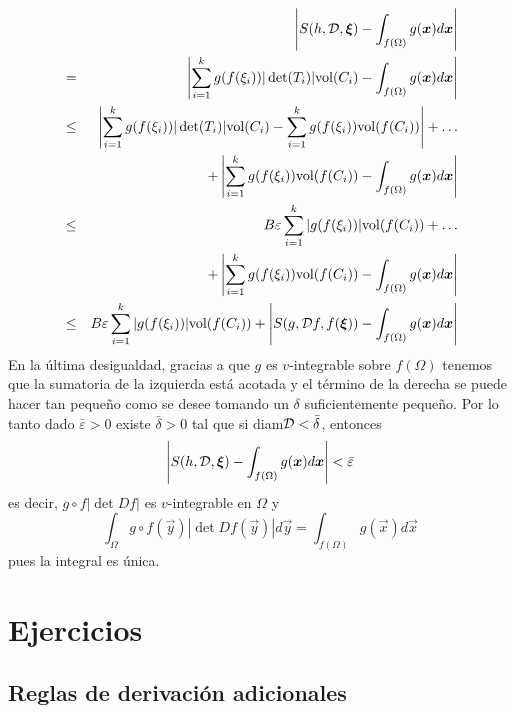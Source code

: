 \begin{demostracion}
\begin{eqnarray*}
& &\left|S(h,{\cal D},\vec{\xi})-\int_{f(\Omega)}g(\vec{x})d\vec{x}\right|\\
&=&\left|\sum_{i=1}^kg(f(\xi_i))|\det(T_i)|{\rm
vol}(C_i)-\int_{f(\Omega)}g(\vec{x})d\vec{x}\right| \\ 
&\leq& \left|\sum_{i=1}^kg(f(\xi_i))|\det(T_i)|{\rm
vol}(C_i)-\sum_{i=1}^kg(f(\xi_i)){\rm vol}(f(C_i))\right|+\ldots \\ 
& & + \left|\sum_{i=1}^kg(f(\xi_i)){\rm
vol}(f(C_i))-\int_{f(\Omega)}g(\vec{x})d\vec{x}\right| \\ 
&\leq& B\varepsilon\sum_{i=1}^k|g(f(\xi_i))|{\rm vol}(f(C_i))+\ldots \\ 
& & + \left|\sum_{i=1}^kg(f(\xi_i)){\rm
vol}(f(C_i))-\int_{f(\Omega)}g(\vec{x})d\vec{x}\right| \\ 
&\leq&
B\varepsilon\sum_{i=1}^k|g(f(\xi_i))|{\rm
vol}(f(C_i))+\left|S(g,{\cal D}f,f(\vec{\xi}))-\int_{f(\Omega)}g(\vec{x})d\vec{x}\right|
\end{eqnarray*}
En la \'ultima desigualdad, gracias a que $g$ es $v$-integrable
sobre $f(\Omega)$ tenemos que la sumatoria de la izquierda est\'a
acotada y el t\'ermino de la derecha se puede hacer tan peque\~no
como se desee tomando un $\delta$ suficientemente peque\~no. Por
lo tanto dado $\bar{\varepsilon}>0$ existe $\bar{\delta}>0$ tal que si
diam${\cal D}<\bar{\delta}$, entonces
\[\left|S(h,{\cal D},\vec{\xi})-\int_{f(\Omega)}g(\vec{x})d\vec{x}\right|<\bar{\varepsilon}\]
es decir, $g\circ f|\det Df|$ es $v$-integrable en $\Omega$ y
\[\int_{\Omega}g\circ f(\vec{y})|\det Df(\vec{y})|d\vec{y}=\int_{f(\Omega)}g(\vec{x})d\vec{x}\]
pues la integral es \'unica.
\end{demostracion}

 

\section{Ejercicios}

\subsection*{Reglas de derivaci\'on adicionales}



